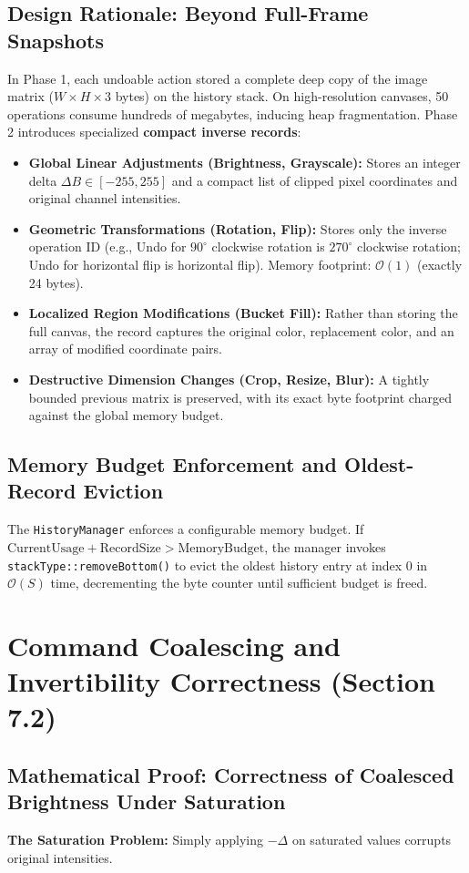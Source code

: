\documentclass[10pt,a4paper]{article}
\begin{document}
\subsection{Design Rationale: Beyond Full-Frame Snapshots}
In Phase 1, each undoable action stored a complete deep copy of the image matrix ($W \times H \times 3$ bytes) on the history stack. On high-resolution canvases, 50 operations consume hundreds of megabytes, inducing heap fragmentation. Phase 2 introduces specialized \textbf{compact inverse records}:
\begin{itemize}
    \item \textbf{Global Linear Adjustments (Brightness, Grayscale):} Stores an integer delta $\Delta B \in [-255, 255]$ and a compact list of clipped pixel coordinates and original channel intensities.
    \item \textbf{Geometric Transformations (Rotation, Flip):} Stores only the inverse operation ID (e.g., Undo for $90^\circ$ clockwise rotation is $270^\circ$ clockwise rotation; Undo for horizontal flip is horizontal flip). Memory footprint: $\mathcal{O}(1)$ (exactly 24 bytes).
    \item \textbf{Localized Region Modifications (Bucket Fill):} Rather than storing the full canvas, the record captures the original color, replacement color, and an array of modified coordinate pairs.
    \item \textbf{Destructive Dimension Changes (Crop, Resize, Blur):} A tightly bounded previous matrix is preserved, with its exact byte footprint charged against the global memory budget.
\end{itemize}

\subsection{Memory Budget Enforcement and Oldest-Record Eviction}
The \texttt{HistoryManager} enforces a configurable memory budget. If $\text{CurrentUsage} + \text{RecordSize} > \text{MemoryBudget}$, the manager invokes \texttt{stackType::removeBottom()} to evict the oldest history entry at index 0 in $\mathcal{O}(S)$ time, decrementing the byte counter until sufficient budget is freed.

\section{Command Coalescing and Invertibility Correctness (Section 7.2)}

\subsection{Mathematical Proof: Correctness of Coalesced Brightness Under Saturation}
\textbf{The Saturation Problem:} Simply applying $-\Delta$ on saturated values corrupts original intensities.
\end{document}
